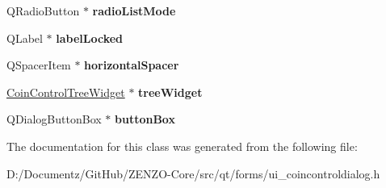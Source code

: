 \begin{DoxyCompactItemize}
Q\+Radio\+Button $\ast$ {\bfseries radio\+List\+Mode}
\item 
\mbox{\label{class_ui___coin_control_dialog_a973d08e9b76bf24eb77a6d6e48f15eca}} 
Q\+Label $\ast$ {\bfseries label\+Locked}
\item 
\mbox{\label{class_ui___coin_control_dialog_ad4011270e7aeda0dc6495bc63bf65395}} 
Q\+Spacer\+Item $\ast$ {\bfseries horizontal\+Spacer}
\item 
\mbox{\label{class_ui___coin_control_dialog_a9f8e456b713e0ed492474c4ad8ea5c3a}} 
\mbox{\hyperlink{class_coin_control_tree_widget}{Coin\+Control\+Tree\+Widget}} $\ast$ {\bfseries tree\+Widget}
\item 
\mbox{\label{class_ui___coin_control_dialog_a6ed3d4726b1a498ab9a11cd1db934736}} 
Q\+Dialog\+Button\+Box $\ast$ {\bfseries button\+Box}
\end{DoxyCompactItemize}


The documentation for this class was generated from the following file\+:\begin{DoxyCompactItemize}
\item 
D\+:/\+Documentz/\+Git\+Hub/\+Z\+E\+N\+Z\+O-\/\+Core/src/qt/forms/ui\+\_\+coincontroldialog.\+h\end{DoxyCompactItemize}
